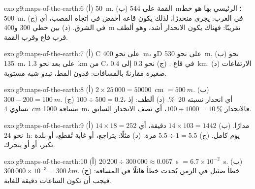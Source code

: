 \begin{solution}{exo:g9:maps-of-the-earth:6}
(أ) \qty{50}{m}. (ب) القمة على  \qty{544}{m}؛  الرئيسي
 بها هو خط \qty{500}{m}. (ج) في الغرب:  يجري منحدرًا، لذلك
يكون قاعه أخفض في اتجاه المصب، أي في الشرق. (د) بين خطي 300
و\qty{400}{m} تقريبًا: فهناك يكون الانحدار أشد، وهو ألطف قرب قاع 
وقرب القمة.
\end{solution}

\begin{solution}{exo:g9:maps-of-the-earth:7}
(أ) C على  نحو \qty{400}{m}، وD على  نحو \qty{530}{m}.
(ب) نحو \qty{135}{m}، على بعد نحو \qty{1.3}{km} من C، في قاع .
(ج) نحو 0.3 إلى \qty{0.4}{km}. (د) الارتفاعات صغيرة مقارنةً بالمسافات:
فدون المط، تبدو  شبه مستوية.
\end{solution}

\begin{solution}{exo:g9:maps-of-the-earth:8}
(أ) $2 \times 25\,000 = \num{50000}$~cm $= \qty{500}{m}$. (ب) $300 - 200 =
\qty{100}{m}$. (ج) $100 \div 500 = 0.2$، أي انحدار نسبته \qty{20}{\%}. (د) ألطف:
إذ تساوي \qty{4}{cm} مسافة \qty{1000}{m}، فالانحدار $100 \div 1000 = \qty{10}{\%}$،
أي نصف الانحدار السابق.
\end{solution}

\begin{solution}{exo:g9:maps-of-the-earth:9}
(أ) $14 \times 18 = 252$ مدارًا. (ب) $14 \times 103 = 1442$ دقيقة، أي نحو
\qty{24}{h}: يوم كامل. (ج) $5.5 \div 1 = 5.5$ مرة. (د) مثلًا: 
يتراجع، أو غابة تُقطع، أو بلدة تكبر، أو  أو 
يتحرك.
\end{solution}

\begin{solution}{exo:g9:maps-of-the-earth:10}
(أ) $20\,200 \div 300\,000 \approx 0.067$~s $= 6.7 \times 10^{-2}$~s.
(ب) $300\,000 \times 10^{-3} = \qty{300}{km}$. (ج) خطأ ضئيل في الزمن
يُحدث خطأ هائلًا في المسافة: فيجب أن تكون الساعات دقيقة للغاية.
\end{solution}

